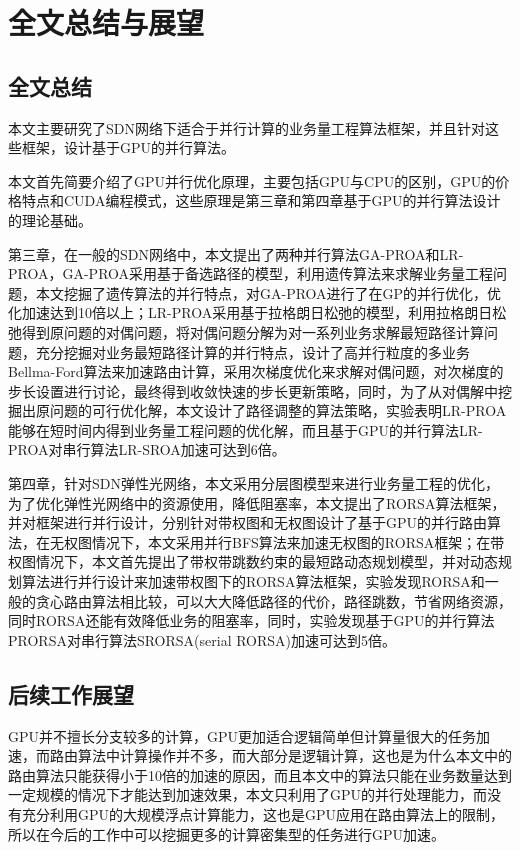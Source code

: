 \documentclass[master]{thesis-uestc}
\begin{document}
\chapter{全文总结与展望}
\section{全文总结}
本文主要研究了SDN网络下适合于并行计算的业务量工程算法框架，并且针对这些框架，设计基于GPU的并行算法。

本文首先简要介绍了GPU并行优化原理，主要包括GPU与CPU的区别，GPU的价格特点和CUDA编程模式，这些原理是第三章和第四章基于GPU的并行算法设计的理论基础。

第三章，在一般的SDN网络中，本文提出了两种并行算法GA-PROA和LR-PROA，GA-PROA采用基于备选路径的模型，利用遗传算法来求解业务量工程问题，本文挖掘了遗传算法的并行特点，对GA-PROA进行了在GP的并行优化，优化加速达到10倍以上；LR-PROA采用基于拉格朗日松弛的模型，利用拉格朗日松弛得到原问题的对偶问题，将对偶问题分解为对一系列业务求解最短路径计算问题，充分挖掘对业务最短路径计算的并行特点，设计了高并行粒度的多业务Bellma-Ford算法来加速路由计算，采用次梯度优化来求解对偶问题，对次梯度的步长设置进行讨论，最终得到收敛快速的步长更新策略，同时，为了从对偶解中挖掘出原问题的可行优化解，本文设计了路径调整的算法策略，实验表明LR-PROA能够在短时间内得到业务量工程问题的优化解，而且基于GPU的并行算法LR-PROA对串行算法LR-SROA加速可达到6倍。

第四章，针对SDN弹性光网络，本文采用分层图模型来进行业务量工程的优化，为了优化弹性光网络中的资源使用，降低阻塞率，本文提出了RORSA算法框架，并对框架进行并行设计，分别针对带权图和无权图设计了基于GPU的并行路由算法，在无权图情况下，本文采用并行BFS算法来加速无权图的RORSA框架；在带权图情况下，本文首先提出了带权带跳数约束的最短路动态规划模型，并对动态规划算法进行并行设计来加速带权图下的RORSA算法框架，实验发现RORSA和一般的贪心路由算法相比较，可以大大降低路径的代价，路径跳数，节省网络资源，同时RORSA还能有效降低业务的阻塞率，同时，实验发现基于GPU的并行算法PRORSA对串行算法SRORSA(serial RORSA)加速可达到5倍。

\section{后续工作展望}
GPU并不擅长分支较多的计算，GPU更加适合逻辑简单但计算量很大的任务加速，而路由算法中计算操作并不多，而大部分是逻辑计算，这也是为什么本文中的路由算法只能获得小于10倍的加速的原因，而且本文中的算法只能在业务数量达到一定规模的情况下才能达到加速效果，本文只利用了GPU的并行处理能力，而没有充分利用GPU的大规模浮点计算能力，这也是GPU应用在路由算法上的限制，所以在今后的工作中可以挖掘更多的计算密集型的任务进行GPU加速。
\end{document}
